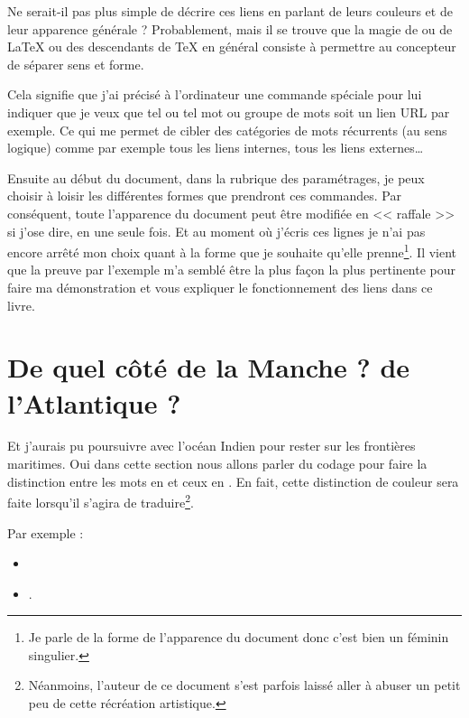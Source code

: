 Ne serait-il pas plus simple de décrire ces liens en parlant de leurs
couleurs et de leur apparence générale ? Probablement, mais il se
trouve que la magie de
\href{https://en.wikipedia.org/wiki/XeTeX}{\XeLaTeX} ou de \LaTeX{} ou
des descendants de \TeX{} en général consiste à permettre au concepteur
de séparer sens et forme.

Cela signifie que j'ai précisé à l'ordinateur une commande spéciale
pour lui indiquer que je veux que tel ou tel mot ou groupe de mots
soit un lien URL par exemple. Ce qui me permet de cibler des
catégories de mots récurrents (au sens logique) comme par exemple tous
les liens internes, tous les liens externes\dots 

Ensuite au début du document, dans la rubrique des paramétrages, je
peux choisir à loisir les différentes formes que prendront ces
commandes. Par conséquent, toute l'apparence du document peut être
modifiée en << raffale >> si j'ose dire, en une seule fois. Et au
moment où j'écris ces lignes je n'ai pas encore arrêté mon choix quant
à la forme que je souhaite qu'elle prenne\footnote{Je parle de la
  forme de l'apparence du document donc c'est bien un féminin
  singulier.}. Il vient que la preuve par l'exemple m'a semblé être la
plus façon la plus pertinente pour faire ma démonstration et vous
expliquer le fonctionnement des liens dans ce livre.

\newpage

\section{De quel côté de la Manche ? de l'Atlantique ?}\label{sec:side}

Et j'aurais pu poursuivre avec l'océan Indien pour rester sur les
frontières maritimes. Oui dans cette section nous allons parler du
codage pour faire la distinction entre les mots en  et
ceux en . En fait, cette distinction de couleur sera
faite lorsqu'il s'agira de traduire\footnote{Néanmoins, l'auteur de ce
  document s'est parfois laissé aller à abuser un petit peu de cette
  récréation artistique.}.

Par exemple :
\begin{itemize}
\item {}
\item {}.  
\end{itemize}

